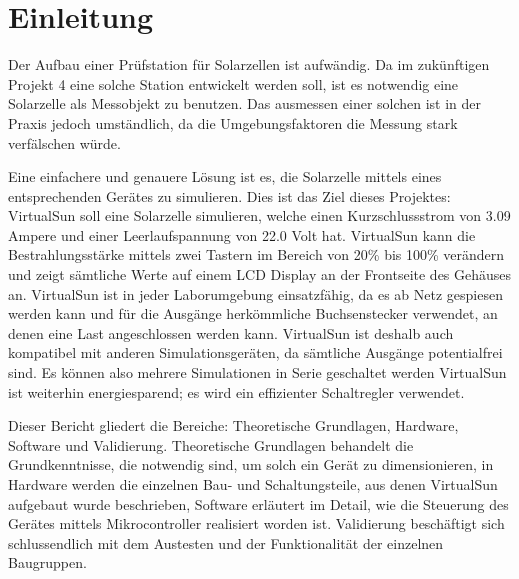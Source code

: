 %
%
%

\section{Einleitung}

Der Aufbau einer Prüfstation für Solarzellen ist aufwändig. Da im zukünftigen Projekt 4 eine solche Station entwickelt werden soll, ist es notwendig eine Solarzelle als Messobjekt zu benutzen. Das ausmessen einer solchen ist in 
der Praxis jedoch umständlich, da die Umgebungsfaktoren die Messung stark verfälschen würde.


Eine einfachere und genauere Lösung ist es, die Solarzelle mittels eines entsprechenden Gerätes zu simulieren. Dies ist das Ziel dieses Projektes: VirtualSun soll eine Solarzelle simulieren, welche einen Kurzschlussstrom von 3.09 Ampere und einer Leerlaufspannung von 22.0 Volt hat. VirtualSun kann die Bestrahlungsstärke mittels zwei Tastern im Bereich von 20\% bis 100\% verändern und zeigt sämtliche Werte auf einem LCD Display an der Frontseite des Gehäuses an. VirtualSun ist in jeder Laborumgebung einsatzfähig, da es ab Netz gespiesen werden kann und für die Ausgänge herkömmliche Buchsenstecker verwendet, an denen eine Last angeschlossen werden kann. VirtualSun ist deshalb auch kompatibel mit anderen Simulationsgeräten, da sämtliche Ausgänge potentialfrei sind. Es können also mehrere Simulationen in Serie geschaltet werden  VirtualSun ist weiterhin energiesparend; es wird ein effizienter Schaltregler verwendet. 

Dieser Bericht gliedert
die Bereiche: Theoretische Grundlagen, Hardware, Software und Validierung. Theoretische Grundlagen behandelt die Grundkenntnisse, die notwendig sind, um solch ein Gerät zu dimensionieren, in Hardware werden die einzelnen Bau- und Schaltungsteile, aus denen VirtualSun aufgebaut wurde beschrieben, Software erläutert im Detail, wie die Steuerung des Gerätes mittels Mikrocontroller realisiert worden ist. Validierung beschäftigt sich schlussendlich mit dem Austesten und der Funktionalität der einzelnen Baugruppen.

%